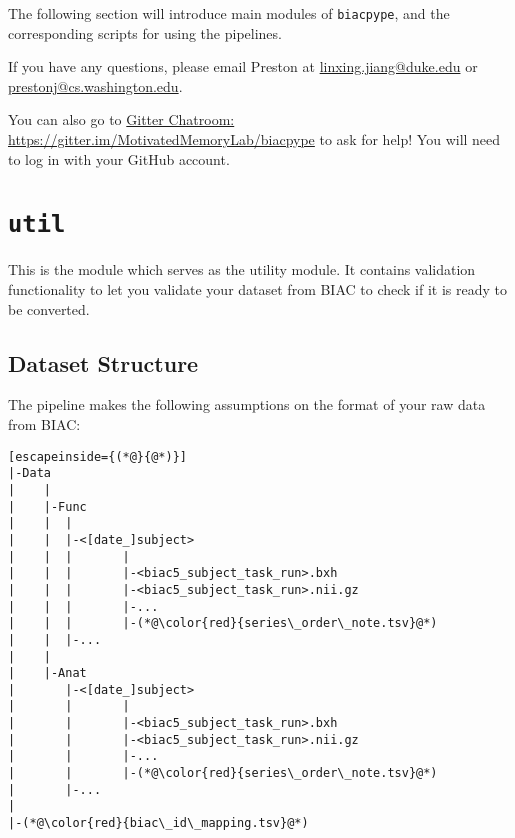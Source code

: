 \documentclass[12pt]{myland}
\begin{document}
    The following section will introduce main modules of \texttt{biacpype}, and the corresponding scripts for using
    the pipelines. 

    If you have any questions, please email Preston at 
    \href{mailto:linxing.jiang@duke.edu}{linxing.jiang@duke.edu}
    or \href{mailto:prestonj@cs.washington.edu}{prestonj@cs.washington.edu}. \par
    
    You can also go to
    \href{https://gitter.im/MotivatedMemoryLab/biacpype}{Gitter Chatroom: https://gitter.im/MotivatedMemoryLab/biacpype} to ask for help!
    You will need to log in with your GitHub account.

\newpage
\section{\texttt{util}}
This is the module which serves as the utility module. It contains validation functionality to let you validate your 
dataset from BIAC to check if it is ready to be converted. 

\subsection{Dataset Structure}
   The pipeline makes the following assumptions on the format of your raw data from BIAC:
   \begin{lstlisting}[escapeinside={(*@}{@*)}]
|-Data
|    |
|    |-Func
|    |  |
|    |  |-<[date_]subject>
|    |  |       |
|    |  |       |-<biac5_subject_task_run>.bxh
|    |  |       |-<biac5_subject_task_run>.nii.gz
|    |  |       |-...
|    |  |       |-(*@\color{red}{series\_order\_note.tsv}@*)
|    |  |-...
|    |
|    |-Anat
|       |-<[date_]subject>
|       |       |
|       |       |-<biac5_subject_task_run>.bxh
|       |       |-<biac5_subject_task_run>.nii.gz
|       |       |-...
|       |       |-(*@\color{red}{series\_order\_note.tsv}@*)
|       |-...
|
|-(*@\color{red}{biac\_id\_mapping.tsv}@*)
    \end{lstlisting}
\end{document}
